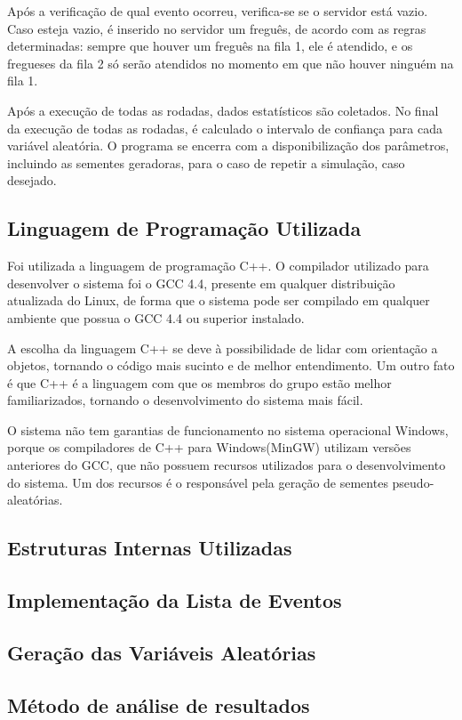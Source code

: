 \documentclass[a4paper,10pt]{article}
\begin{document}
    Após a verificação de qual evento ocorreu, verifica-se se o servidor está vazio. Caso esteja vazio, é inserido no servidor um freguês, de acordo com as regras
determinadas: sempre que houver um freguês na fila 1, ele é atendido, e os fregueses da fila 2 só serão atendidos no momento em que não houver ninguém na fila 1.

    Após a execução de todas as rodadas, dados estatísticos são coletados. No final da execução de todas as rodadas, é calculado o intervalo de confiança para cada
variável aleatória. O programa se encerra com a disponibilização dos parâmetros, incluindo as sementes geradoras, para o caso de repetir a simulação, caso desejado.

\subsection{Linguagem de Programação Utilizada}
    Foi utilizada a linguagem de programação C++. O compilador utilizado para desenvolver o sistema foi o GCC 4.4, presente em qualquer distribuição atualizada do Linux, de forma que o sistema pode ser compilado em qualquer ambiente que possua o GCC 4.4 ou superior instalado.

    A escolha da linguagem C++ se deve à possibilidade de lidar com orientação a objetos, tornando o código mais sucinto e de melhor entendimento. Um outro fato é que C++ é a linguagem com que os membros do grupo estão melhor familiarizados, tornando o desenvolvimento do sistema mais fácil.

    O sistema não tem garantias de funcionamento no sistema operacional Windows, porque os compiladores de C++ para Windows(MinGW) utilizam versões anteriores do GCC, que não possuem recursos utilizados para o desenvolvimento do sistema. Um dos recursos é o responsável pela geração de sementes pseudo-aleatórias.
\subsection{Estruturas Internas Utilizadas}
\subsection{Implementação da Lista de Eventos}
\subsection{Geração das Variáveis Aleatórias}
\subsection{Método de análise de resultados}
\end{document}
